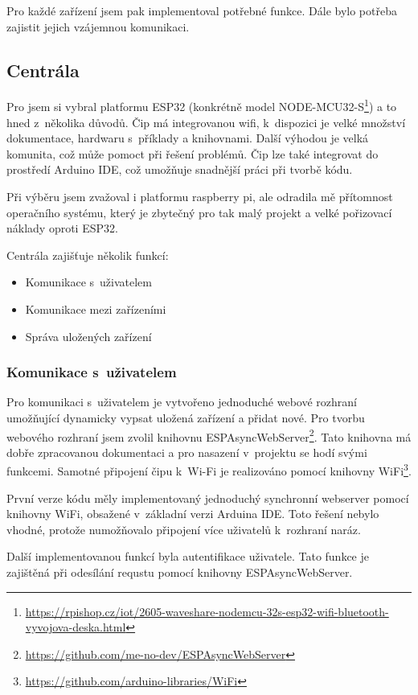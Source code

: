 \documentclass[11pt,a4paper,twoside,openright]{report}
\begin{document}
	Pro každé zařízení jsem pak implementoval potřebné funkce. Dále bylo potřeba zajistit jejich vzájemnou komunikaci.
	
	\subsection{Centrála}
	
	Pro  jsem  si vybral platformu ESP32 (konkrétně model NODE-MCU32-S\footnote{\url{https://rpishop.cz/iot/2605-waveshare-nodemcu-32s-esp32-wifi-bluetooth-vyvojova-deska.html}}) a to hned z~několika důvodů. Čip má integrovanou wifi, k~dispozici je velké množství dokumentace, hardwaru s~příklady a knihovnami. Další výhodou je velká komunita, což může pomoct při řešení problémů. Čip lze také integrovat do prostředí Arduino IDE, což umožňuje snadnější práci při tvorbě kódu.
	
	
	Při výběru jsem zvažoval i platformu raspberry pi, ale odradila mě přítomnost operačního systému, který je zbytečný pro tak malý projekt a velké pořizovací náklady oproti ESP32.
	
	Centrála zajišťuje několik funkcí:
	\begin{itemize}
		\item Komunikace s~uživatelem
		\item Komunikace mezi zařízeními
		\item Správa uložených zařízení
	\end{itemize}
	
	\subsubsection{Komunikace s~uživatelem}
	
	Pro komunikaci s~uživatelem je vytvořeno jednoduché webové rozhraní umožňující dynamicky vypsat uložená zařízení a přidat nové. Pro tvorbu webového rozhraní jsem zvolil knihovnu ESPAsyncWebServer\footnote{\url{https://github.com/me-no-dev/ESPAsyncWebServer}}. Tato knihovna má dobře zpracovanou dokumentaci a pro nasazení v~projektu se hodí svými funkcemi. Samotné připojení čipu k~Wi-Fi je realizováno pomocí knihovny WiFi\footnote{\url{https://github.com/arduino-libraries/WiFi}}.
	
	
	První verze kódu měly implementovaný jednoduchý synchronní webserver pomocí knihovny WiFi, obsažené v~základní verzi Arduina IDE. Toto řešení nebylo vhodné, protože numožňovalo připojení více uživatelů k~rozhraní naráz.
	
	
	Další implementovanou funkcí byla autentifikace uživatele. Tato funkce je zajištěná při odesílání requstu pomocí knihovny ESPAsyncWebServer.
	
\end{document}
